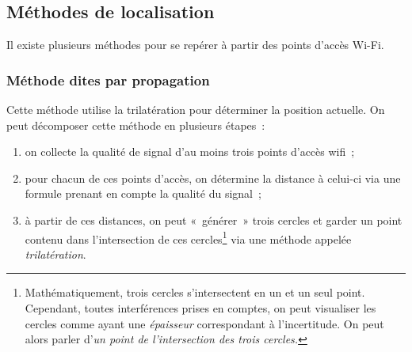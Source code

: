 \documentclass[11pt,a4paper]{article}
\begin{document}
  \subsection{Méthodes de localisation}
  Il existe plusieurs méthodes pour se repérer à partir des points d'accès Wi-Fi.

  \subsubsection{Méthode dites par propagation}
    Cette méthode utilise la trilatération pour déterminer la position actuelle. On peut décomposer cette méthode en plusieurs étapes~:
    \begin{enumerate}
      \item on collecte la qualité de signal d'au moins trois points d'accès wifi~;
      \item pour chacun de ces points d'accès, on détermine la distance à celui-ci via une formule prenant en compte la qualité du signal~;
      \item à partir de ces distances, on peut «~générer~» trois cercles et garder un point contenu dans l'intersection de ces cercles\footnote{Mathématiquement, trois cercles s'intersectent en un et un seul point. Cependant, toutes interférences prises en comptes, on peut visualiser les cercles comme ayant une \textit{épaisseur} correspondant à l'incertitude. On peut alors parler d'\textit{un point de l'intersection des trois cercles.}} via une méthode appelée \textit{trilatération}.
    \end{enumerate}
\end{document}
